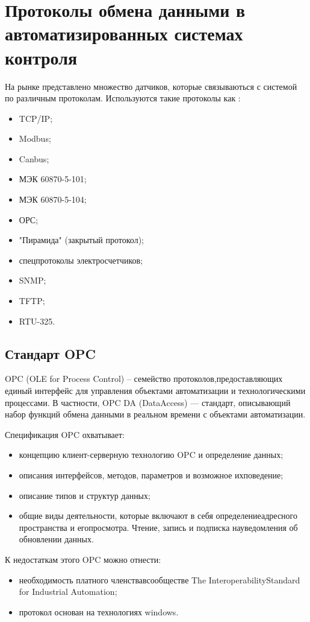 \newpage
\section{Протоколы обмена данными в автоматизированных системах контроля}
\setcounter{figure}{0}

На рынке представлено множество датчиков, которые связываються с системой по различным протоколам. Используются такие протоколы как \cite{csp}:
\begin{itemize}
\item TCP/IP;
\item Modbus;
\item Canbus;
\item МЭК 60870-5-101;
\item МЭК 60870-5-104;
\item ОРС;
\item "Пирамида" (закрытый протокол);
\item спецпротоколы электросчетчиков;
\item SNMP;
\item TFTP;
\item RTU-325.
\end{itemize}

\subsection{Стандарт OPC}

OPC (OLE for Process Control) – семейство протоколов,предоставляющих единый интерфейс для управления объектами автоматизации и технологическими процессами. В частности, OPC DA (DataAccess) — стандарт, описывающий набор функций обмена данными в реальном времени с объектами автоматизации. 

Спецификация OPC охватывает:
\begin{itemize}
 \item концепцию клиент-серверную технологию OPC и определение данных;
 \item описания интерфейсов, методов, параметров и возможное ихповедение;
 \item описание типов и структур данных;
 \item общие виды деятельности, которые включают в себя определениеадресного пространства и егопросмотра. Чтение, запись и подписка науведомления об обновлении данных.
\end{itemize}

К недостаткам этого OPC можно отнести:
\begin{itemize}
 \item необходимость платного членствавсообществе The InteroperabilityStandard for Industrial Automation;
 \item протокол основан на технологиях windows.
\end{itemize}

